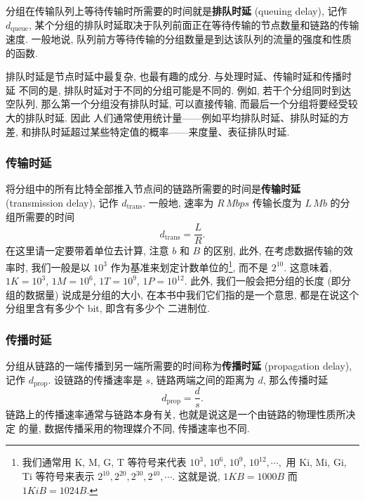 \documentclass[10pt,UTF8]{book} %
\begin{document}
分组在传输队列上等待传输时所需要的时间就是\textbf{排队时延} (queuing delay),
记作 $d_\mathrm{queue}$,
某个分组的排队时延取决于队列前面正在等待传输的节点数量和链路的传输速度. 一般地说,
队列前方等待传输的分组数量是到达该队列的流量的强度和性质的函数.

排队时延是节点时延中最复杂, 也最有趣的成分. 与处理时延、传输时延和传播时延
不同的是, 排队时延对于不同的分组可能是不同的. 例如, 若干个分组同时到达空队列,
那么第一个分组没有排队时延, 可以直接传输, 而最后一个分组将要经受较大的排队时延. 因此
人们通常使用统计量——例如平均排队时延、排队时延的方差,
和排队时延超过某些特定值的概率——来度量、表征排队时延.

\subsubsection{传输时延}

将分组中的所有比特全部推入节点间的链路所需要的时间是\textbf{传输时延}
(transmission delay), 记作
$d_\mathrm{trans}$. 一般地, 速率为 $R \, \si{Mbps}$ 传输长度为 
$L \, \si{Mb}$ 的分组所需要的时间
\[ d_\mathrm{trans} = \dfrac{L}{R}. \]
在这里请一定要带着单位去计算, 注意 $\si{b}$ 和 $\si{B}$ 的区别, 此外,
在考虑数据传输的效率时, 我们一般是以 $10^3$ 作为基准来划定计数单位的\footnote{
    我们通常用 K, M, G, T 等符号来代表 $10^3$, $10^6$, $10^9$, $10^{12}, \cdots,$
    用 Ki, Mi, Gi, Ti 等符号来表示 $2^{10}, 2^{20}, 2^{30}, 2^{40}, \cdots$.
    这就是说, $1\si{KB} = 1000\si{B}$ 而 $1\si{KiB} = 1024\si{B}$.
}, 而不是
$2^{10}$. 这意味着, $1 \si{K} = 10^3$, $1 \si{M} = 10^6$,
$1 \si{T} = 10^9$, $1 \si{P} = 10^{12}$.
此外, 我们一般会把分组的长度 (即分组的数据量) 说成是分组的大小,
在本书中我们它们指的是一个意思, 都是在说这个分组里含有多少个 bit, 即含有多少个
二进制位.



\subsubsection{传播时延}

分组从链路的一端传播到另一端所需要的时间称为\textbf{传播时延} 
(propagation delay), 记作 $d_\mathrm{prop}$.
设链路的传播速率是 $s$, 链路两端之间的距离为 $d$, 那么传播时延
\[ d_\mathrm{prop} = \dfrac{d}{s}. \]
链路上的传播速率通常与链路本身有关, 也就是说这是一个由链路的物理性质所决定
的量, 数据传播采用的物理媒介不同, 传播速率也不同.

\vspace{1em}
\end{document}
